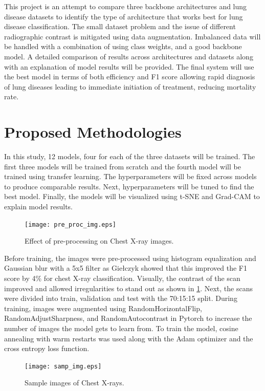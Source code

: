 \documentclass[10pt,twocolumn,letterpaper]{article}
\begin{document}
This project is an attempt to compare three backbone architectures and lung disease datasets to identify the type of architecture that works best for lung disease classification. The small dataset problem and the issue of different radiographic contrast \cite{andrew2022rad} is mitigated using data augmentation. Imbalanced data will be handled with a combination of using class weights, and a good backbone model. A detailed comparison of results across architectures and datasets along with an explanation of model results will be provided. The final system will use the best model in terms of both efficiency and F1 score allowing rapid diagnosis of lung diseases leading to immediate initiation of treatment, reducing mortality rate.
\section{Proposed Methodologies}
\label{sec:prop_method}
In this study, 12 models, four for each of the three datasets will be trained. The first three models will be trained from scratch and the fourth model will be trained using transfer learning. The hyperparameters will be fixed across models to produce comparable results. Next, hyperparameters will be tuned to find the best model. Finally, the models will be visualized using t-SNE and Grad-CAM \cite{jacobgilpytorchcam} to explain model results. 
\begin{figure}[t]
  \centering
  \texttt{[image: pre\_proc\_img.eps]}  
   \caption{Effect of pre-processing on Chest X-ray images.}
   \vspace{-1em}
   \label{fig:pre_proc_img}
\end{figure}
Before training, the images were pre-processed using histogram equalization and Gaussian blur with a 5x5 filter as Giełczyk \etal \cite{gielczyk2022pre} showed that this improved the F1 score by 4\% for chest X-ray classification. Visually, the contrast of the scan improved and allowed irregularities to stand out as shown in \cref{fig:pre_proc_img}. Next, the scans were divided into train, validation and test with the 70:15:15 split. During training, images were augmented using RandomHorizontalFlip, RandomAdjustSharpness, and RandomAutocontrast in Pytorch \cite{transforms} to increase the number of images the model gets to learn from. To train the model, cosine annealing with warm restarts \cite{loshchilov2016sgdr} was used along with the Adam optimizer \cite{kingma2014adam} and the cross entropy loss function. 
\begin{figure}[t]
  \centering
  \texttt{[image: samp\_img.eps]}  
   \caption{Sample images of Chest X-rays.}
   \vspace{-0.5em}
   \label{fig:sample_img}
\end{figure}
\end{document}
